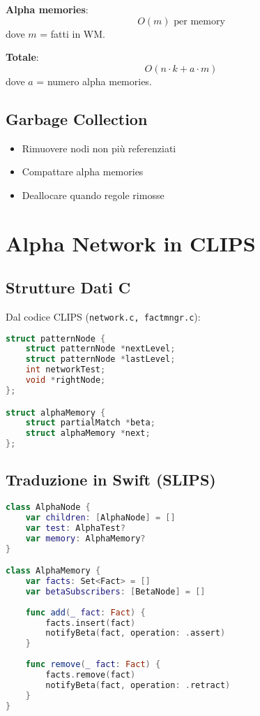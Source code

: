 \textbf{Alpha memories}:
\begin{equation}
O(m) \text{ per memory}
\end{equation}
dove $m$ = fatti in WM.

\textbf{Totale}:
\begin{equation}
O(n \cdot k + a \cdot m)
\end{equation}
dove $a$ = numero alpha memories.

\subsection{Garbage Collection}

\begin{itemize}
\item Rimuovere nodi non più referenziati
\item Compattare alpha memories
\item Deallocare quando regole rimosse
\end{itemize}

\section{Alpha Network in CLIPS}

\subsection{Strutture Dati C}

Dal codice CLIPS (\texttt{network.c, factmngr.c}):

\begin{lstlisting}[language=C]
struct patternNode {
    struct patternNode *nextLevel;
    struct patternNode *lastLevel;
    int networkTest;
    void *rightNode;
};

struct alphaMemory {
    struct partialMatch *beta;
    struct alphaMemory *next;
};
\end{lstlisting}

\subsection{Traduzione in Swift (SLIPS)}

\begin{lstlisting}[language=Swift]
class AlphaNode {
    var children: [AlphaNode] = []
    var test: AlphaTest?
    var memory: AlphaMemory?
}

class AlphaMemory {
    var facts: Set<Fact> = []
    var betaSubscribers: [BetaNode] = []
    
    func add(_ fact: Fact) {
        facts.insert(fact)
        notifyBeta(fact, operation: .assert)
    }
    
    func remove(_ fact: Fact) {
        facts.remove(fact)
        notifyBeta(fact, operation: .retract)
    }
}
\end{lstlisting}

